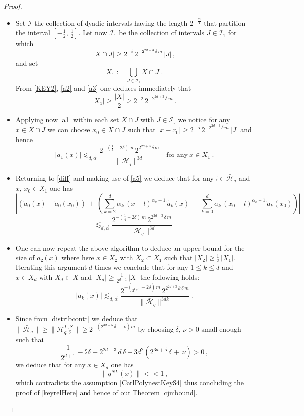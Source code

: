 \documentclass[a4paper,reqno]{amsart}
\numberwithin{equation}{section}
\theoremstyle{definition}
\def\beq{\begin{equation}}
\def\eeq{\end{equation}}
\def\beq{\begin{equation}}
\def\eeq{\end{equation}}
\def\a{\alpha}
\def\H{\mathcal{H}}
\def\beq{\begin{equation}}
\def\eeq{\end{equation}}
\def\beq{\begin{equation}}
\def\eeq{\end{equation}}
\def\d{\delta}
\def\I{\mathcal{I}}
\begin{document}
\begin{proof}
\begin{itemize}
\item Set $\I$ the collection of dyadic intervals having the length $2^{-\frac{m}{4}}$ that partition the interval $[-\frac{1}{2},\,\frac{1}{2}]$. Let now $\I_{1}$ be the collection of intervals $J\in \I_{1}$ for which
\beq\label{a2}
|X\cap J|\geq 2^{-5}\,2^{-2^{2d+3}\,\d\,m}\,|J|\,,
\eeq
and set
\beq\label{a3}
X_{1}:=\bigcup_{J\in \I_{1}} X\cap J\;.
\eeq
From \eqref{KEY2}, \eqref{a2} and \eqref{a3} one deduces immediately that
\beq\label{a4}
|X_{1}|\geq \frac{|X|}{2}\geq 2^{-2}\,2^{-2^{2d+3}\,\d\,m}\;.
\eeq
\item Applying now \eqref{a1} within each set $X\cap J$ with $J\in \I_{1}$ we notice for any $x\in X\cap J$ we can choose $x_0\in X\cap J$ such that $|x-x_0|\geq 2^{-5}\,2^{-2^{2d+3}\,\d\,m}\,|J|$ and hence
\beq\label{a5}
|a_1(x)|\lesssim_{d,\vec{\a}}   \frac{2^{-(\frac{1}{4}-2\d)\,m}\,2^{2^{2d+3}\,\d\,m}}
{\|\bar{\H}_{q}\|^{3d}}\:\;\:\:\textrm{for any}\:x\in X_{1}\:.
\eeq
\item Returning to \eqref{diff} and making use of \eqref{a5} we deduce that for any $l\in\bar{\H}_{q}$ and $x,\,x_0 \in X_1$ one has
\beq\label{diff1}
\eeq
$$\left|\left(\tilde{a}_0(x)-\tilde{a}_0(x_0)\right)\,+\,\left(\sum_{k=2}^d \a_k\,(x-l)^{\a_k-1}\,\tilde{a}_k(x)\,-\,\sum_{k=0}^d \a_k\,(x_0-l)^{\a_k-1}\,\tilde{a}_k(x_0)\right)\right|$$
$$\lesssim_{d,\vec{\a}} \frac{2^{-(\frac{1}{4}-2\d)\,m}\,2^{2^{2d+3}\,\d\,m}}
{\|\bar{\H}_{q}\|^{3d}}\,.$$

\item One can now repeat the above algorithm to deduce an upper bound for the size of $a_2(x)$ where here $x\in X_2$ with $X_2\subset X_1$ such that $|X_2|\geq \frac{1}{2}\,|X_1|$. Iterating this argument $d$ times we conclude that for any $1\leq k\leq d$ and $x\in X_d$ with $X_d\subset X$ and $|X_d|\geq \frac{1}{2^{d+1}}\,|X|$ the following holds:
\beq\label{a6}
|a_k(x)|\lesssim_{d,\vec{\a}}   \frac{2^{-(\frac{1}{2^{k+1}}-2\d)\,m}\,2^{2^{2d+3}\,k\,\d\,m}}{\|\bar{\H}_{q}\|^{3d k}}\:.
\eeq
\item Since from \eqref{distribcontr} we deduce that $\|\bar{\H}_{q}\|\geq \|\mathcal{H}_{q,\d}^{L,S}\|\geq 2^{-(2^{3d+5}\,\d\,+\,\nu)\,m}$ by choosing $\d,\,\nu>0$ small enough such that
\beq\label{a8}
\frac{1}{2^{d+1}}-2\d-2^{2d+3}\,d\,\d-3d^2(2^{3d+5}\,\d\,+\,\nu)>0\,,
\eeq
we deduce that for any $x\in X_d$ one has
\beq\label{a9}
\|q^{NL}(x)\|<<1\,,
\eeq
which contradicts the assumption \eqref{CarlPolynestKeyS4} thus concluding the proof of \eqref{keyrelHere} and hence of our Theorem \ref{cjmbound}.
\end{itemize}
\end{proof}
\end{document}
